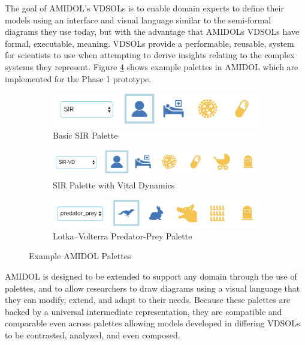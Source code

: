 \documentclass[11pt]{article}
\newcommand{\amidol}{\textsc{AMIDOL}}
\begin{document}
The goal of \amidol{}'s VDSOLs is to enable domain experts to define their models using an interface and visual language similar to the semi-formal diagrams they use today, but with the advantage that \amidol{}s VDSOLs have formal, executable, meaning.  VDSOLs provide a performable, reusable, system for scientists to use when attempting to derive insights relating to the complex systems they represent.  Figure \ref{Fig:Palettes} shows example palettes in \amidol{} which are implemented for the Phase 1 prototype.

\begin{figure}
  \begin{subfigure}[b]{\textwidth}
    \includegraphics[width=\textwidth]{figs/SIR-palette.png}
    \caption{Basic SIR Palette}
    \label{Fig:SIRPalette}
  \end{subfigure}
  \begin{subfigure}[b]{\textwidth}
    \includegraphics[width=\textwidth]{figs/SIR-VD-palette.png}
    \caption{SIR Palette with Vital Dynamics}
    \label{Fig:SIRVDPalette}
  \end{subfigure}
  \begin{subfigure}[b]{\textwidth}
    \includegraphics[width=\textwidth]{figs/PREDPREY-palette.png}
    \caption{Lotka–Volterra Predator-Prey Palette}
    \label{Fig:PREDPREYPalette}    
  \end{subfigure}
  \caption{Example \amidol{} Palettes}
  \label{Fig:Palettes}
\end{figure}

\amidol{} is designed to be extended to support any domain through the use of palettes, and to allow researchers to draw diagrams using a visual language that they can modify, extend, and adapt to their needs.  Because these palettes are backed by a universal intermediate representation, they are compatible and comparable even across palettes allowing models developed in differing VDSOLs to be contrasted, analyzed, and even composed.
\end{document}
